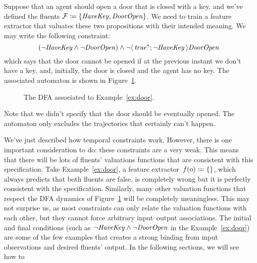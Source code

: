 \begin{example}
	Suppose that an agent should open a door that is closed with a key, and
	we've defined the fluents $\mathcal{F} \coloneqq \{\text{\textit{HaveKey}},
	\text{\textit{DoorOpen}}\}$. We need to train a feature extractor that valuates these
	two propositions with their intended meaning. We may write the following
	constraint:
	\[
		(\neg \text{\textit{HaveKey}} \land \neg \text{\textit{DoorOpen}})
		\land \neg \langle\, {\text{\textit{true}}^*; \neg \text{\textit{HaveKey}}} \,\rangle\text{\textit{DoorOpen}}
	\]
	which says that the door cannot be opened if at the previous instant we
	don't have a key, and, initially, the door is closed and the agent has no key.
	The associated automaton is shown in Figure~\ref{fig:door-automa}.
	\begin{figure}
			\centering
			\caption{The DFA associated to Example~\ref{ex:door}.}
			\label{fig:door-automa}
	\end{figure}
	Note that we didn't specify that the door should be eventually opened. The
	automaton only excludes the trajectories that certainly can't happen.
	\label{ex:door}
\end{example}

We've just described how temporal constraints work. However, there is one
important consideration to do: these constraints are a very weak. This means
that there will be lots of fluents' valuations functions that are consistent
with this specification. Take Example~\ref{ex:door}, a feature
extractor~${f(o) \coloneqq \{\}}$, which always predicts that both fluents
are false, is completely wrong but it is perfectly consistent with the
specification. Similarly, many other valuation functions that respect the DFA
dynamics of Figure~\ref{fig:door-automa} will be completely meaningless.
This may not surprise us, as most constraints can only relate the
valuation functions with each other, but they cannot force arbitrary
input--output associations. The initial and final conditions (such as $\neg
\text{\textit{HaveKey}} \land \neg \text{\textit{DoorOpen}}$ in the Example~\ref{ex:door})
are some of the few examples that creates a strong binding from input
observations and desired fluents' output. In the following sections, we will
see how to 

